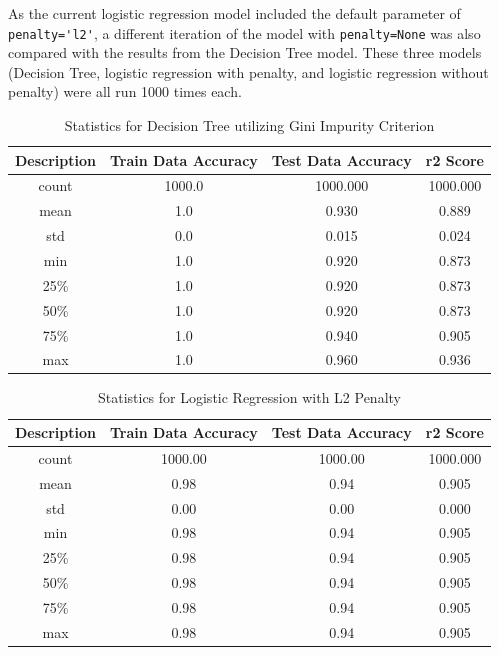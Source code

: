 \documentclass[journal]{IEEEtran}
\begin{document}
As the current logistic regression model included the default parameter of \lstinline{penalty='l2'}, a different iteration of the model with \lstinline{penalty=None} was also compared with the results from the Decision Tree model. These three models (Decision Tree, logistic regression with penalty, and logistic regression without penalty) were all run 1000 times each. 

\begin{table}[h!]
\centering
\begin{tabular}{ c | c c c }
    Description & Train Data Accuracy & Test Data Accuracy & r2 Score \\
\hline
count   &            1000.0   &      1000.000 &  1000.000\\
mean    &               1.0   &         0.930 &     0.889\\
std     &               0.0   &         0.015 &     0.024\\
min     &               1.0   &         0.920 &     0.873\\
25\%    &                1.0  &          0.920 &     0.873\\
50\%    &                1.0  &          0.920 &     0.873\\
75\%    &                1.0  &          0.940 &     0.905\\
max     &               1.0   &         0.960 &     0.936\\
\end{tabular}
\caption{Statistics for Decision Tree utilizing Gini Impurity Criterion}
\label{table:dtGI}
\end{table}

\begin{table}[h!]
\centering
\begin{tabular}{ c | c c c }
    Description & Train Data Accuracy & Test Data Accuracy & r2 Score \\
\hline
count       &       1000.00    &         1000.00&  1000.000 \\
mean        &          0.98    &            0.94&     0.905 \\
std         &          0.00    &            0.00&     0.000 \\
min         &          0.98    &            0.94 &    0.905 \\
25\%        &           0.98   &             0.94 &    0.905 \\
50\%        &           0.98   &             0.94 &    0.905 \\
75\%        &           0.98   &             0.94 &    0.905 \\
max         &          0.98    &            0.94  &   0.905 \\
\end{tabular}
\caption{Statistics for Logistic Regression with L2 Penalty}
\label{table:logRegL2}
\end{table}
\end{document}
